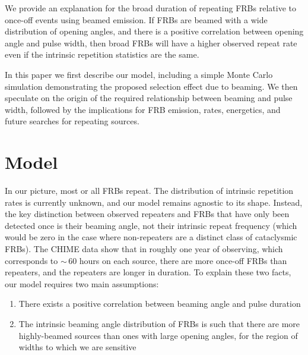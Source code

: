 \documentclass[fleqn,usenatbib]{mnras}
\begin{document}
We provide an explanation for the broad duration of repeating FRBs 
relative to once-off events using beamed emission. 
If FRBs are beamed with a 
wide distribution of opening angles, and there is a positive correlation 
between opening angle and pulse width, then broad FRBs will have a 
higher observed repeat rate even if the intrinsic 
repetition statistics are the same.

In this paper we first describe our model, including a simple Monte 
Carlo simulation demonstrating the proposed selection effect due to 
beaming. We then speculate on the origin of the required relationship 
between beaming and pulse width, followed by the implications 
for FRB emission, rates, energetics, and future searches for 
repeating sources.

\section{Model}
\label{sect-model}
In our picture, most or all FRBs repeat. The distribution of intrinsic 
repetition rates is currently unknown, and our model remains agnostic to its shape. Instead, 
the key distinction between observed repeaters and FRBs that have only been 
detected once is their beaming angle, not their 
intrinsic repeat frequency (which would be zero in the case where non-repeaters are 
a distinct class of cataclysmic FRBs). The CHIME data show that in roughly one year of observing, which corresponds to $\sim$\,60 hours on each source, there are more once-off FRBs than repeaters, 
and the repeaters are longer in duration. To explain these two facts, 
our model requires two main assumptions: 

\begin{enumerate}
    \item There exists a positive correlation 
          between beaming angle and pulse duration
    \item The intrinsic beaming angle distribution of FRBs
          is such that there are more highly-beamed sources than ones with large 
          opening angles, for the region of widths to which we are sensitive
\end{enumerate}
\end{document}
